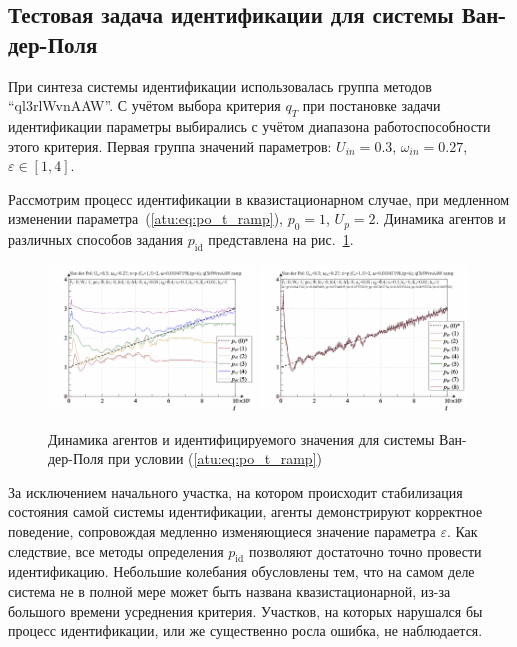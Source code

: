 
\subsection{Тестовая задача идентификации для системы Ван-дер-Поля}  %

При синтеза системы идентификации использовалась группа методов ``ql3rlWvnAAW''.
С учётом выбора критерия $q_{T}$ при постановке задачи идентификации
параметры выбирались с учётом диапазона работоспособности этого критерия.
Первая группа значений параметров: $U_{in}=0.3$, $\omega_{in}=0.27$, $ \varepsilon \in [1, 4 ]$.

Рассмотрим процесс идентификации
в квазистационарном случае,
при медленном изменении параметра~(\ref{atu:eq:po_t_ramp}), $p_0=1$, $U_p=2$.
Динамика агентов и различных способов задания $p_\mathrm{id}$
представлена на рис.~\ref{atu:f:vdp_id1_ramp}.

\begin{figure}[ht!]
\begin{center}
  \includegraphics[width=0.49\textwidth]{p/cha/vdp/vdp_id-p_t_pi_ql3rlWvnAAW_ramp.png}
  \hfill
  \includegraphics[width=0.49\textwidth]{p/cha/vdp/vdp_id-p_t_p_ql3rlWvnAAW_ramp.png}
\end{center}
  \caption{Динамика агентов и идентифицируемого значения для системы Ван-дер-Поля при условии (\ref{atu:eq:po_t_ramp})}
\label{atu:f:vdp_id1_ramp}
\end{figure}

За исключением начального участка, на котором происходит стабилизация
состояния самой системы идентификации, агенты демонстрируют корректное поведение,
сопровождая медленно изменяющиеся значение параметра $\varepsilon$.
Как следствие, все методы определения $p_\mathrm{id}$
позволяют достаточно точно провести идентификацию.
Небольшие колебания обусловлены тем, что на самом деле
система не в полной мере может быть названа квазистационарной,
из-за большого времени усреднения критерия.
Участков, на которых нарушался бы процесс идентификации,
или же существенно росла ошибка, не наблюдается.

